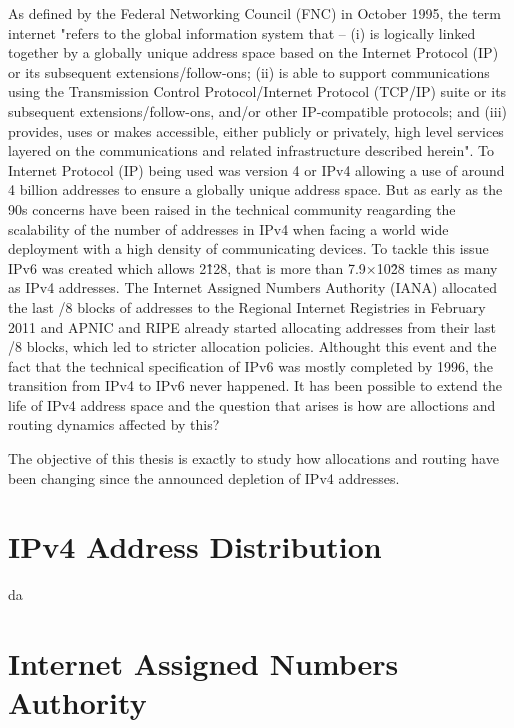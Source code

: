 \documentclass[11pt,a4paper]{scrreprt}
\begin{document}
As defined by the Federal Networking Council (FNC) in October 1995, the term internet "refers to the global information system that -- (i) is logically linked together by a globally unique address space based on the Internet Protocol (IP) or its subsequent extensions/follow-ons; (ii) is able to support communications using the Transmission Control Protocol/Internet Protocol (TCP/IP) suite or its subsequent extensions/follow-ons, and/or other IP-compatible protocols; and (iii) provides, uses or makes accessible, either publicly or privately, high level services layered on the communications and related infrastructure described herein". To Internet Protocol (IP) being used was version 4 or IPv4 allowing a use of around 4 billion addresses to ensure a globally unique address space. 
But as early as the 90s concerns have been raised in the technical community reagarding the scalability of the number of addresses in IPv4 when facing a world wide deployment with a high density of communicating devices. To tackle this issue IPv6 was created which allows 2\^128, that is more than 7.9×10\^28 times as many as IPv4 addresses. 
The Internet Assigned Numbers Authority (IANA) allocated the last /8 blocks of addresses to the Regional Internet Registries in February 2011 and APNIC and RIPE already started allocating addresses from their last /8 blocks, which led to stricter allocation policies. Althought this event and the fact that the technical specification of IPv6 was mostly completed by 1996, the transition from IPv4 to IPv6 never happened. It has been possible to extend the life of IPv4 address space and the question that arises is how are alloctions and routing dynamics affected by this?     

The objective of this thesis is exactly to study how allocations and routing have been changing since the announced depletion of IPv4 addresses. 

\section{IPv4 Address Distribution}
da
\section{Internet Assigned Numbers Authority}
\end{document}
